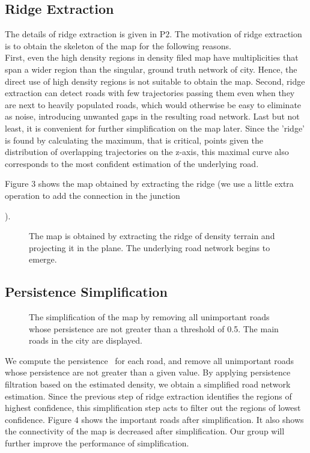 \documentclass[11pt]{article}
\begin{document}
\subsection*{Ridge Extraction}
The details of ridge extraction is given in P$2$. The motivation of ridge extraction is to obtain the skeleton of the map for the following reasons.\\
First, even the high density regions in density filed map have multiplicities that span a wider region than the singular, ground truth network of city. Hence, the direct use of high density regions is not suitable to obtain the map. Second, ridge extraction
can detect roads with few trajectories passing them even when they
are next to heavily populated roads, which would otherwise be easy to eliminate as noise, introducing unwanted gaps in the resulting road network. Last but not least, it is convenient for further simplification on the map later. Since the 'ridge' is found by calculating the maximum, that is critical, points given the distribution of overlapping trajectories on the z-axis, this maximal curve also corresponds to the most confident estimation of the underlying road. 

Figure $3$ shows the map obtained by extracting the ridge (we use a little extra operation to add the connection in the junction \begin{comment} WHY? \end{comment}).
 \begin{figure}[H]
  \caption{The map is obtained by extracting the ridge of density terrain and projecting it in the plane. The underlying road network begins to emerge.}
  \centering 
\end{figure}

\subsection*{Persistence Simplification}
\begin{figure}[h!]
  \caption{The simplification of the map by removing all unimportant roads whose persistence are not greater than a threshold of 0.5. The main roads in the city are displayed.} 
  \centering
\end{figure}
We compute the persistence~\cite{edelsbrunner2008persistent} for each road, and remove all unimportant roads whose persistence are not greater than a given value. By applying persistence filtration based on the estimated density, we obtain a simplified road network estimation. Since the previous step of ridge extraction identifies the regions of highest confidence, this simplification step acts to filter out the regions of lowest confidence. Figure $4$ shows the important roads after simplification. It also shows the connectivity of the map is decreased after simplification. Our group will further improve the performance of simplification.
\end{document}
